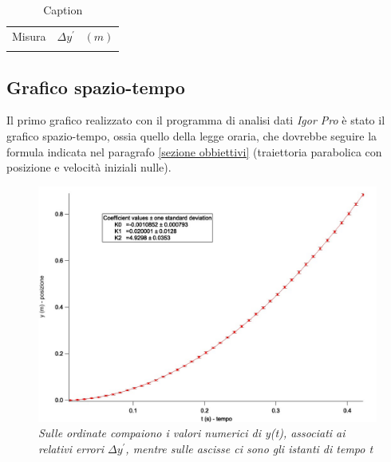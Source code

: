 \documentclass[12pt, a4paper]{article}
\begin{document}
\begin{table}[!h]
    \centering
    \begin{tabular}{|c|c|}
    \hline
    \multirow{2}{*}{\small Misura} 
    &\multirow{2}{*}{$ \Delta y^{'}$ \ $(m)$} 
     
    \\
    & 
    \\
    \hline
    \hline
       &   \\
    \hline
    \end{tabular}
        \caption{Caption}
        \label{tab:my_label}
\end{table}




\subsection{Grafico spazio-tempo} \label{Agg. misure xconcl}
Il primo grafico realizzato con il programma di analisi dati \textit{Igor Pro} è stato il grafico spazio-tempo, ossia quello della legge oraria, che dovrebbe seguire la formula indicata nel paragrafo \ref{sezione obbiettivi} (traiettoria parabolica con posizione e velocità iniziali nulle).\\ 

    \begin{figure}[h!]
\centering
\includegraphics[width=170mm]{Immagini/Graph4 non comp.jpg}
\caption{\textit{{\footnotesize{Sulle ordinate compaiono i valori numerici di \textit{y(t)}, associati ai relativi errori  \textit{$\Delta y^{'}$}, mentre sulle ascisse ci sono gli istanti di tempo \textit{t}}}}}
\label{Grafico parabolico}
\end{figure}
\end{document}
